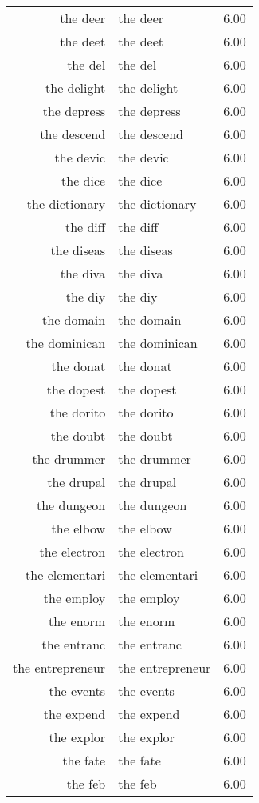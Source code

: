 \begin{table}[ht]
\begin{tabular}{rlr}
  the deer & the deer & 6.00 \\ 
  the deet & the deet & 6.00 \\ 
  the del & the del & 6.00 \\ 
  the delight & the delight & 6.00 \\ 
  the depress & the depress & 6.00 \\ 
  the descend & the descend & 6.00 \\ 
  the devic & the devic & 6.00 \\ 
  the dice & the dice & 6.00 \\ 
  the dictionary & the dictionary & 6.00 \\ 
  the diff & the diff & 6.00 \\ 
  the diseas & the diseas & 6.00 \\ 
  the diva & the diva & 6.00 \\ 
  the diy & the diy & 6.00 \\ 
  the domain & the domain & 6.00 \\ 
  the dominican & the dominican & 6.00 \\ 
  the donat & the donat & 6.00 \\ 
  the dopest & the dopest & 6.00 \\ 
  the dorito & the dorito & 6.00 \\ 
  the doubt & the doubt & 6.00 \\ 
  the drummer & the drummer & 6.00 \\ 
  the drupal & the drupal & 6.00 \\ 
  the dungeon & the dungeon & 6.00 \\ 
  the elbow & the elbow & 6.00 \\ 
  the electron & the electron & 6.00 \\ 
  the elementari & the elementari & 6.00 \\ 
  the employ & the employ & 6.00 \\ 
  the enorm & the enorm & 6.00 \\ 
  the entranc & the entranc & 6.00 \\ 
  the entrepreneur & the entrepreneur & 6.00 \\ 
  the events & the events & 6.00 \\ 
  the expend & the expend & 6.00 \\ 
  the explor & the explor & 6.00 \\ 
  the fate & the fate & 6.00 \\ 
  the feb & the feb & 6.00 \\ 

\end{tabular}
\end{table}
